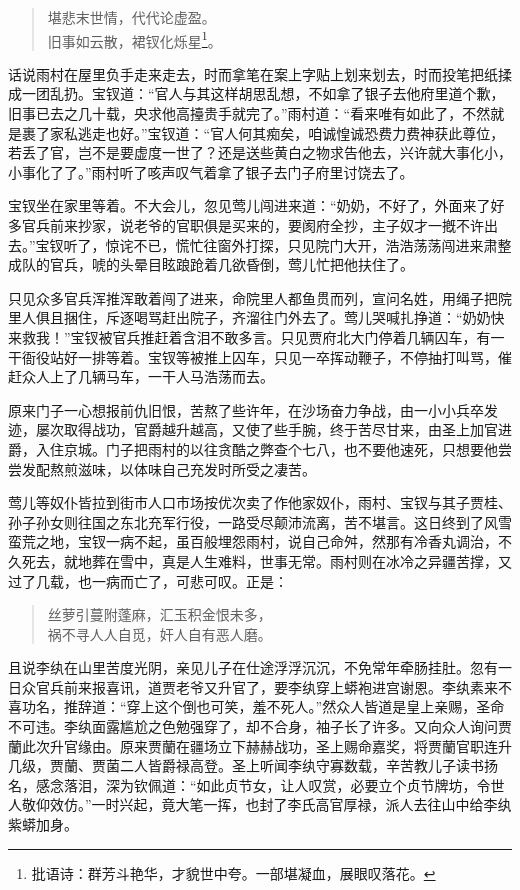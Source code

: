 \documentclass[12pt,oneside]{book}
\newenvironment{shici}{%
\begin{verse}%
\centering\large\hspace{12pt}}%
{\end{verse}}
\begin{document}
\begin{shici}
堪悲末世情，代代论虚盈。\\
旧事如云散，裙钗化烁星\footnote{批语诗：群芳斗艳华，才貌世中夸。一部堪凝血，展眼叹落花。}。
\end{shici}


话说雨村在屋里负手走来走去，时而拿笔在案上字贴上划来划去，时而投笔把纸揉成一团乱扔。宝钗道：“官人与其这样胡思乱想，不如拿了银子去他府里道个歉，旧事已去之几十载，央求他高擡贵手就完了。”雨村道：“看来唯有如此了，不然就是裹了家私逃走也好。”宝钗道：“官人何其痴矣，咱诚惶诚恐费力费神获此尊位，若丢了官，岂不是要虚度一世了？还是送些黄白之物求告他去，兴许就大事化小，小事化了了。”雨村听了咳声叹气着拿了银子去门子府里讨饶去了。

宝钗坐在家里等着。不大会儿，忽见莺儿闯进来道：“奶奶，不好了，外面来了好多官兵前来抄家，说老爷的官职俱是买来的，要阂府全抄，主子奴才一摡不许出去。”宝钗听了，惊诧不已，慌忙往窗外打探，只见院门大开，浩浩荡荡闯进来肃整成队的官兵，唬的头晕目眩踉跄着几欲昏倒，莺儿忙把他扶住了。

只见众多官兵浑推浑敢着闯了进来，命院里人都鱼贯而列，宣问名姓，用绳子把院里人俱且捆住，斥逐喝骂赶出院子，齐溜往门外去了。莺儿哭喊扎挣道：“奶奶快来救我！”宝钗被官兵推赶着含泪不敢多言。只见贾府北大门停着几辆囚车，有一干衙役站好一排等着。宝钗等被推上囚车，只见一卒挥动鞭子，不停抽打叫骂，催赶众人上了几辆马车，一干人马浩荡而去。

原来门子一心想报前仇旧恨，苦熬了些许年，在沙场奋力争战，由一小小兵卒发迹，屡次取得战功，官爵越升越高，又使了些手腕，终于苦尽甘来，由圣上加官进爵，入住京城。门子把雨村的以往贪酷之弊查个七八，也不要他速死，只想要他尝尝发配熬煎滋味，以体味自己充发时所受之凄苦。

莺儿等奴仆皆拉到街市人口市场按优次卖了作他家奴仆，雨村、宝钗与其子贾桂、孙子孙女则往国之东北充军行役，一路受尽颠沛流离，苦不堪言。这日终到了风雪蛮荒之地，宝钗一病不起，虽百般埋怨雨村，说自己命舛，然那有冷香丸调治，不久死去，就地葬在雪中，真是人生难料，世事无常。雨村则在冰冷之异疆苦撑，又过了几载，也一病而亡了，可悲可叹。正是：

\begin{shici}
丝萝引蔓附蓬麻，汇玉积金恨未多，\\
祸不寻人人自觅，奸人自有恶人磨。
\end{shici}


且说李纨在山里苦度光阴，亲见儿子在仕途浮浮沉沉，不免常年牵肠挂肚。忽有一日众官兵前来报喜讯，道贾老爷又升官了，要李纨穿上蟒袍进宫谢恩。李纨素来不喜功名，推辞道：“穿上这个倒也可笑，羞不死人。”然众人皆道是皇上亲赐，圣命不可违。李纨面露尴尬之色勉强穿了，却不合身，袖子长了许多。又向众人询问贾蘭此次升官缘由。原来贾蘭在疆场立下赫赫战功，圣上赐命嘉奖，将贾蘭官职连升几级，贾蘭、贾菌二人皆爵禄高登。圣上听闻李纨守寡数载，辛苦教儿子读书扬名，感念落泪，深为钦佩道：“如此贞节女，让人叹赏，必要立个贞节牌坊，令世人敬仰效仿。”一时兴起，竟大笔一挥，也封了李氏高官厚禄，派人去往山中给李纨紫蟒加身。
\end{document}
